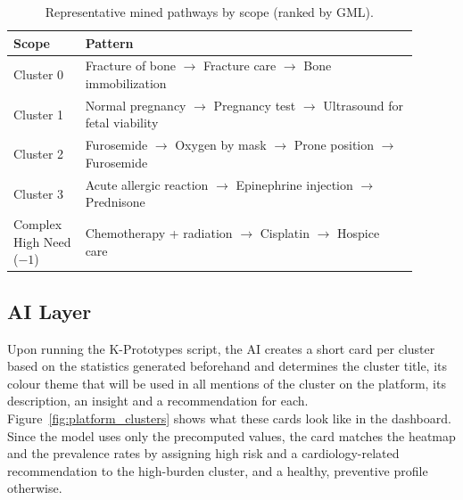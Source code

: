 \begin{table}[t]

\caption{Representative mined pathways by scope (ranked by GML).}

\label{tab:patterns}

\centering

\footnotesize

\begin{tabular}{@{}p{0.16\linewidth}p{0.74\linewidth}@{}}

\toprule

Scope & Pattern \\

\midrule

Cluster 0 & Fracture of bone $\rightarrow$ Fracture care $\rightarrow$ Bone immobilization \\

Cluster 1 & Normal pregnancy $\rightarrow$ Pregnancy test $\rightarrow$ Ultrasound for fetal viability \\

Cluster 2 & Furosemide $\rightarrow$ Oxygen by mask $\rightarrow$ Prone position $\rightarrow$ Furosemide \\

Cluster 3 & Acute allergic reaction $\rightarrow$ Epinephrine injection $\rightarrow$ Prednisone \\

Complex High Need ($-1$) & Chemotherapy + radiation $\rightarrow$ Cisplatin $\rightarrow$ Hospice care \\

\bottomrule

\end{tabular}

\end{table}

\subsection{AI Layer}

Upon running the K-Prototypes script, the AI creates a short card per cluster based on the statistics generated beforehand and determines the cluster title, its colour theme that will be used in all mentions of the cluster on the platform, its description, an insight and a recommendation for each. Figure~\ref{fig:platform_clusters} shows what these cards look like in the dashboard. Since the model uses only the precomputed values, the card matches the heatmap and the prevalence rates by assigning high risk and a cardiology-related recommendation to the high-burden cluster, and a healthy, preventive profile otherwise.

